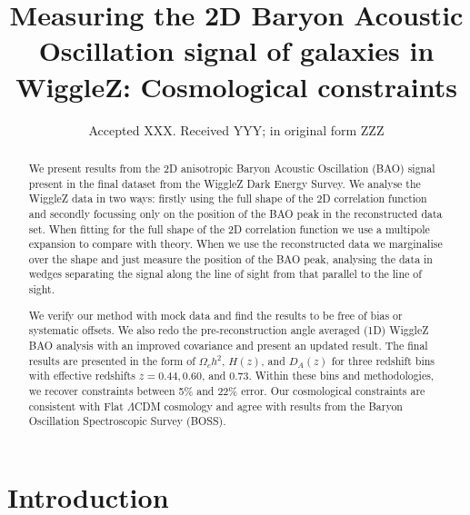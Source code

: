 \documentclass[a4paper,fleqn,usenatbib]{mnras}
\title[WiggleZ 2D BAO]{Measuring the 2D Baryon Acoustic Oscillation signal of galaxies in WiggleZ: Cosmological constraints} %
\author[S. R. Hinton et al.]{Samuel R. Hinton,$^{1,2}$\thanks{E-mail: \href{samuelreay@gmail.com}}
Eyal Kazin,$^{3,2}$
Tamara M. Davis,$^{1,2}$
Chris Blake,$^{3,2}$\newauthor
Sarah Brough,$^{5}$
Matthew Colless,$^{4}$
Warrick J. Couch,$^{5}$ \newauthor
Michael J. Drinkwater,$^{1}$
Karl Glazebrook,$^{3}$
Russell J. Jurek,$^{6}$
David Parkinson,$^{1,2}$ \newauthor
Kevin A. Pimbblet,$^{7,8,9}$
Gregory B. Poole,$^{10}$
Michael Pracy$^{11}$ and
David Woods$^{12}$
\\
$^{1}$School of Mathematics and Physics, The University of Queensland, Brisbane, QLD 4072, Australia\\
$^{2}$ARC Centre of Excellence for All-sky Astrophysics (CAASTRO)\\
$^{3}$Centre for Astrophysics \& Supercomputing, Swinburne University of Technology, P.O. Box 218, Hawthorn, VIC 3122, Australia\\
$^{4}$Research School of Astronomy and Astrophysics, The Australian National University, Canberra, ACT 2611, Australia\\
$^{5}$Australian Astronomical Observatory, PO Box 915, North Ryde, NSW 1670, Australia\\
$^{6}$Australia Telescope National Facility, CSIRO, Epping, NSW 1710, Australia\\
$^{7}$E.A.Milne Centre for Astrophysics, University of Hull, Cottingham Road, Hull HU6 7RX, UK\\
$^{8}$School of Physics, Monash University, Clayton, Victoria 3800, Australia;\\ 
$^{9}$Monash Centre for Astrophysics (MoCA), Monash University, Clayton, Victoria 3800, Australia\\
$^{10}$School of Physics, University of Melbourne, Parksville, VIC 3010\\
$^{11}$Sydney Institute for Astronomy, School of Physics, University of Sydney, NSW 2006, Australia\\
$^{12}$Department of Physics and Astronomy, University of British Columbia, 6224 Agricultural Road, Vancouver, BC V6T 1Z1, Canada
}
\date{Accepted XXX. Received YYY; in original form ZZZ}
\begin{document}
\label{firstpage}
\pagerange{\pageref{firstpage}--\pageref{lastpage}}
\maketitle



\begin{abstract}
We present results from the 2D anisotropic Baryon Acoustic Oscillation (BAO) signal present in the final dataset from the WiggleZ Dark Energy Survey.  We analyse the WiggleZ data in two ways: firstly using the full shape of the 2D correlation function and secondly focussing only on the position of the BAO peak in the reconstructed data set. When fitting for the full shape of the 2D correlation function we use a multipole expansion to compare with theory.  When we use the reconstructed data we marginalise over the shape and just measure the position of the BAO peak, analysing the data in wedges separating the signal along the line of sight from that parallel to the line of sight. 

We verify our method with mock data and find the results to be free of bias or systematic offsets.  We also redo the pre-reconstruction angle averaged (1D) WiggleZ BAO analysis with an improved covariance and present an updated result.   The final results are presented in the form of $\Omega_c h^2$, $H(z)$, and $D_A(z)$ for three redshift bins with effective redshifts $z = 0.44, 0.60$, and $0.73$. Within these bins and methodologies, we recover constraints between 5\% and 22\% error. Our cosmological constraints are consistent with Flat $\Lambda$CDM cosmology and agree with results from the Baryon Oscillation Spectroscopic Survey (BOSS).
\end{abstract}


\clearpage
\section{Introduction}
\end{document}
